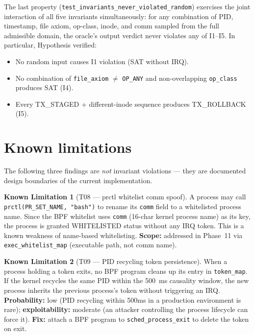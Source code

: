 \documentclass[11pt,a4paper]{article}
\theoremstyle{definition}
\newtheorem{limitation}{Known Limitation}
\begin{document}
The last property (\texttt{test\_invariants\_never\_violated\_random}) exercises
the joint interaction of all five invariants simultaneously: for any combination
of PID, timestamp, file axiom, op-class, inode, and comm sampled from the full
admissible domain, the oracle's output verdict never violates any of I1–I5.
In particular, Hypothesis verified:

\begin{itemize}[noitemsep]
  \item No random input causes I1 violation (SAT without IRQ).
  \item No combination of \texttt{file\_axiom} $\neq$ \texttt{OP\_ANY} and
        non-overlapping \texttt{op\_class} produces SAT (I4).
  \item Every TX\_STAGED + different-inode sequence produces TX\_ROLLBACK (I5).
\end{itemize}

\section{Known limitations}
\label{sec:limits}

The following three findings are \emph{not} invariant violations — they are
documented design boundaries of the current implementation.

\begin{limitation}[T08 — prctl whitelist comm spoof]
A process may call \texttt{prctl(PR\_SET\_NAME, "bash")} to rename its
\texttt{comm} field to a whitelisted process name. Since the BPF whitelist
uses \texttt{comm} (16-char kernel process name) as its key, the process
is granted WHITELISTED status without any IRQ token. This is a known weakness
of name-based whitelisting. \textbf{Scope:} addressed in Phase~11 via
\texttt{exec\_whitelist\_map} (executable path, not comm name).
\end{limitation}

\begin{limitation}[T09 — PID recycling token persistence]
When a process holding a token exits, no BPF program cleans up its entry in
\texttt{token\_map}. If the kernel recycles the same PID within the 500~ms
causality window, the new process inherits the previous process's token without
triggering an IRQ. \textbf{Probability:} low (PID recycling within 500ms in a
production environment is rare); \textbf{exploitability:} moderate (an attacker
controlling the process lifecycle can force it). \textbf{Fix:} attach a BPF
program to \texttt{sched\_process\_exit} to delete the token on exit.
\end{limitation}
\end{document}

